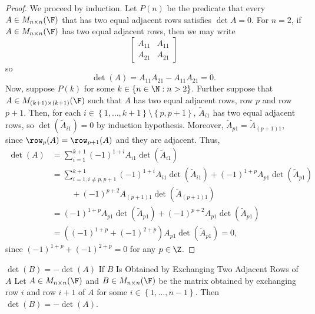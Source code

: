 \documentclass[linearalgebraI]{subfiles}
\begin{document}
    \begin{proof}
        We proceed by induction. Let $P(n)$ be the predicate that every $A\in M_{n\times n}(\F)$ that has two equal adjacent rows satisfies $\det A = 0$. For $n=2$, if $A\in M_{n\times n}(\F)$ has two equal adjacent rows, then we may write
        \begin{equation*}
            \begin{bmatrix}
                A_{11} & A_{11} \\ A_{21} & A_{21}
            \end{bmatrix}
        \end{equation*}
        so
        \begin{equation*}
            \det(A) = A_{11}A_{21} - A_{11}A_{21} = 0.
        \end{equation*}
        Now, suppose $P(k)$ for some $k\in \left\lbrace n\in \N: n>2 \right\rbrace$. Further suppose that $A\in M_{(k+1)\times (k+1)}(\F)$ such that $A$ has two equal adjacent rows, row $p$ and row $p+1$. Then, for each $i\in \left\lbrace 1, \ldots, k+1 \right\rbrace\setminus \left\lbrace p, p+1 \right\rbrace$, $\widetilde{A}_{i1}$ has two equal adjacent rows, so $\det\left( \widetilde{A}_{i1}\right) = 0$ by induction hypothesis. Moreover, $\widetilde{A}_{p1} = \widetilde{A}_{(p+1)1}$, since $\row_p(A) = \row_{p+1}(A)$ and they are adjacent. Thus,
        \begin{align*}
            \det(A) & = \sum^{k+1}_{i=1} (-1)^{1+i} A_{i1} \det \left(\widetilde{A}_{i1}\right) \\
                    & = \sum^{k+1}_{i=1, i\neq p, p+1} (-1)^{1+i} A_{i1} \det \left(\widetilde{A}_{i1}\right) + (-1)^{1+p}A_{p1} \det \left(\widetilde{A}_{p1}\right) \\
                    & \hspace{1cm} + (-1)^{p+2}A_{(p+1)1} \det \left(\widetilde{A}_{(p+1)1}\right) \\
                    & = (-1)^{1+p}A_{p1} \det \left(\widetilde{A}_{p1}\right) + (-1)^{p+2}A_{p1} \det \left(\widetilde{A}_{p1}\right) \\
                    & = \left( (-1)^{1+p} + (-1)^{2+p} \right)  A_{p1} \det \left(\widetilde{A}_{p1}\right) = 0,
        \end{align*} 
        since $(-1)^{1+p} + (-1)^{2+p} = 0$ for any $p\in \Z$.
    \end{proof}
        
    \begin{lemma}{$\det(B) = -\det(A)$ If $B$ Is Obtained by Exchanging Two Adjacent Rows of $A$}
        Let $A\in M_{n\times n}(\F)$ and $B\in M_{n\times n}(\F)$ be the matrix obtained by exchanging row $i$ and row $i+1$ of $A$ for some $i\in \left\lbrace 1, \ldots, n-1 \right\rbrace$. Then $\det(B) = -\det(A)$.
    \end{lemma}
\end{document}
